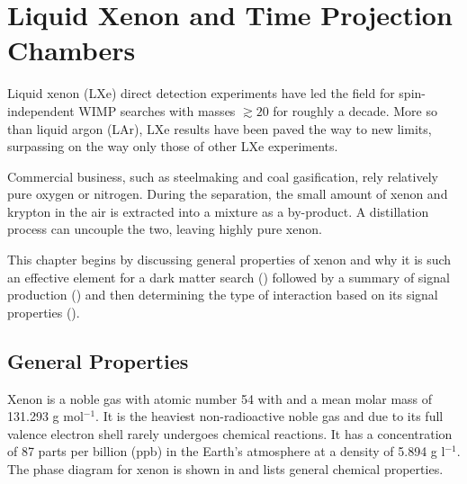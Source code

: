

\pagestyle{cu}
\graphicspath{{./Chapter2/Figures/}}
\chapter[Liquid Xenon and Time Projection Chambers][Liquid Xenon and Time Projection Chambers]{Liquid Xenon and Time Projection Chambers}
\label{chap:liquid_xe}

Liquid xenon (LXe) direct detection experiments have led the field for spin-independent WIMP searches with masses $\gtrsim 20$ for roughly
a decade.  More so than liquid argon (LAr), LXe results have been paved the way to new limits, surpassing on the way only those of
other
LXe experiments.

Commercial business, such as steelmaking and coal gasification, rely relatively pure oxygen or nitrogen.  During the separation,
the small amount of xenon and krypton in the air is extracted into a mixture as a by-product.  A distillation process can uncouple
the two, leaving highly pure xenon.

This chapter begins by discussing general properties of xenon and why it is such an effective element for a dark matter search
() followed by a summary of signal production () and then determining the type of
interaction based on its signal properties ().

\section{General Properties}
\label{sec:properties}
Xenon is a noble gas with atomic number 54 with and a mean molar mass of 131.293 g mol$^{-1}$.  It is the heaviest non-radioactive noble
gas and due to its full valence electron
shell rarely undergoes chemical reactions.  It has a concentration of 87 parts per billion (ppb)
in the Earth's atmosphere at a density of
5.894 g l$^{-1}$.  The phase diagram for xenon is shown in  and  lists general
chemical properties.


